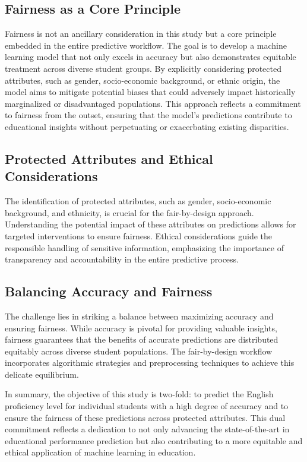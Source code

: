 \documentclass[12pt,a4paper,openright,twoside]{book}
\begin{document}
\subsection{Fairness as a Core Principle}

Fairness is not an ancillary consideration in this study but a core principle embedded in the entire predictive workflow. The goal is to develop a machine learning model that not only excels in accuracy but also demonstrates equitable treatment across diverse student groups. By explicitly considering protected attributes, such as gender, socio-economic background, or ethnic origin, the model aims to mitigate potential biases that could adversely impact historically marginalized or disadvantaged populations. This approach reflects a commitment to fairness from the outset, ensuring that the model's predictions contribute to educational insights without perpetuating or exacerbating existing disparities.

\subsection{Protected Attributes and Ethical Considerations}

The identification of protected attributes, such as gender, socio-economic background, and ethnicity, is crucial for the fair-by-design approach. Understanding the potential impact of these attributes on predictions allows for targeted interventions to ensure fairness. Ethical considerations guide the responsible handling of sensitive information, emphasizing the importance of transparency and accountability in the entire predictive process.

\subsection{Balancing Accuracy and Fairness}

The challenge lies in striking a balance between maximizing accuracy and ensuring fairness. While accuracy is pivotal for providing valuable insights, fairness guarantees that the benefits of accurate predictions are distributed equitably across diverse student populations. The fair-by-design workflow incorporates algorithmic strategies and preprocessing techniques to achieve this delicate equilibrium.

In summary, the objective of this study is two-fold: to predict the English proficiency level for individual students with a high degree of accuracy and to ensure the fairness of these predictions across protected attributes. This dual commitment reflects a dedication to not only advancing the state-of-the-art in educational performance prediction but also contributing to a more equitable and ethical application of machine learning in education.
\end{document}
